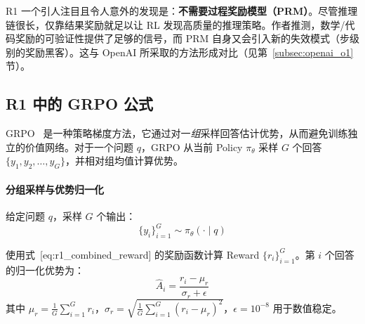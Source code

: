 \begin{warningbox}[没有过程奖励模型]
R1 一个引人注目且令人意外的发现是：\textbf{不需要过程奖励模型（PRM）}。尽管推理链很长，仅靠结果奖励就足以让 RL 发现高质量的推理策略。作者推测，数学/代码奖励的可验证性提供了足够的信号，而 PRM 自身又会引入新的失效模式（步级别的奖励黑客）。这与 OpenAI 所采取的方法形成对比（见第~\ref{subsec:openai_o1} 节）。
\end{warningbox}

\subsection{R1 中的 GRPO 公式}
\label{subsubsec:grpo_r1_math}

GRPO~\cite{shao2024deepseekmath} 是一种策略梯度方法，它通过对一\emph{组}采样回答估计优势，从而避免训练独立的价值网络。对于一个问题 $q$，GRPO 从当前 Policy $\pi_\theta$ 采样 $G$ 个回答 $\{y_1, y_2, \ldots, y_G\}$，并相对组均值计算优势。

\paragraph{分组采样与优势归一化}
\label{group-sampling-and-advantage-normalization}

给定问题 $q$，采样 $G$ 个输出：
\begin{equation}
    \{y_i\}_{i=1}^G \sim \pi_\theta(\cdot \mid q)
\end{equation}

使用式~[eq:r1\_combined\_reward] 的奖励函数计算 Reward $\{r_i\}_{i=1}^G$。第 $i$ 个回答的归一化优势为：
\begin{equation}
    \hat{A}_i = \frac{r_i - \mu_r}{\sigma_r + \epsilon}
\end{equation}
其中 $\mu_r = \frac{1}{G}\sum_{i=1}^G r_i$，$\sigma_r = \sqrt{\frac{1}{G}\sum_{i=1}^G (r_i - \mu_r)^2}$，$\epsilon = 10^{-8}$ 用于数值稳定。

